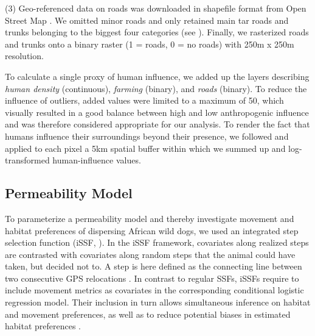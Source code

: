 \documentclass[abstract=on,10pt,a4paper,bibliography=totocnumbered]{scrartcl}
\begin{document}
(3) Geo-referenced data on roads was downloaded in shapefile format from Open
Street Map \citep{OpenStreetMap.2019}. We omitted minor roads and only retained
main tar roads and trunks belonging to the biggest four categories (see
). Finally, we rasterized roads and trunks onto a
binary raster (1 = roads, 0 = no roads) with 250m x 250m resolution.

To calculate a single proxy of human influence, we added up the layers
describing \textit{human density} (continuous), \textit{farming} (binary), and
\textit{roads} (binary). To reduce the influence of outliers, added values
were limited to a maximum of 50, which visually resulted in a good balance
between high and low anthropogenic influence and was therefore considered
appropriate for our analysis. To render the fact that humans influence their
surroundings beyond their presence, we followed \cite{Elliot.2014} and applied
to each pixel a 5km spatial buffer within which we summed up and log-transformed
human-influence values.

\subsection{Permeability Model}
\label{Modeling}
To parameterize a permeability model and thereby investigate movement and
habitat preferences of dispersing African wild dogs, we used an integrated step
selection function (iSSF, \cite{Avgar.2016}). In the iSSF framework, covariates
along realized steps are contrasted with covariates along random steps that the
animal could have taken, but decided not to. A step is here defined as the
connecting line between two consecutive GPS relocations \citep{Turchin.1998}. In
contrast to regular SSFs, iSSFs require to include movement metrics as
covariates in the corresponding conditional logistic regression model. Their
inclusion in turn allows simultaneous inference on habitat and movement
preferences, as well as to reduce potential biases in estimated habitat
preferences \citep{Forester.2009, Warton.2013, Avgar.2016}.
\end{document}
